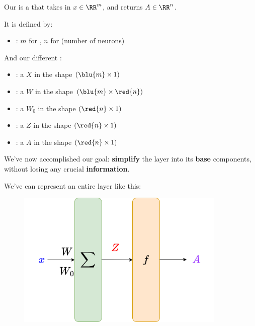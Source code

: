         \begin{notation}
            Our  is a  that takes in $x \in \RR^m$, and returns $A \in \RR^n$.
            
            It is defined by:
            
            \begin{itemize}
                \item {}: $m$ for , $n$ for  (number of neurons)
            \end{itemize}
            
            And our different :
            
            \begin{itemize}
                \item {}: a  $X$ in the shape $(\blu{m} \times 1)$
            
                \item {}: a  $W$ in the shape $(\blu{m} \times \red{n})$
                
                \item {}: a  $W_0$ in the shape $(\red{n} \times 1)$
                
                \item {}: a  $Z$ in the shape $(\red{n} \times 1)$
                
                \item {}: a  $A$ in the shape $(\red{n} \times 1)$
            \end{itemize}
        \end{notation}
        
        We've now accomplished our goal: \textbf{simplify} the layer into its \textbf{base} components, without losing any crucial \textbf{information}.
        
        We've can represent an entire layer like this:
        
        \begin{figure}[H]
            \centering
            \includegraphics[width=100mm,scale=0.4]{images/nn_images/layer_simplified.png}
        \end{figure}
        
